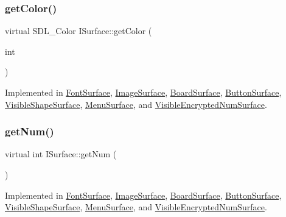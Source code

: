 \mbox{\label{class_i_surface_adf609edb8f871bf37ed9aaf8fe0d2695}} 
\subsubsection{\texorpdfstring{get\+Color()}{getColor()}}
{\footnotesize\ttfamily virtual S\+D\+L\+\_\+\+Color I\+Surface\+::get\+Color (\begin{DoxyParamCaption}\item[{int}]{ }\end{DoxyParamCaption})\hspace{0.3cm}{\ttfamily [pure virtual]}}



Implemented in \mbox{\hyperlink{class_font_surface_afe2bf10c79f421c252fe6a1477ee03dd}{Font\+Surface}}, \mbox{\hyperlink{class_image_surface_a241efe1b9a9cc78e5033f8beff36eb03}{Image\+Surface}}, \mbox{\hyperlink{class_board_surface_aaede8bb86e00ae26f235dd9437ecded7}{Board\+Surface}}, \mbox{\hyperlink{class_button_surface_a4ba118fccc0224e235efcb3b26f0d26c}{Button\+Surface}}, \mbox{\hyperlink{class_visible_shape_surface_a4ffd8c178ae0e39059422ec86bed2034}{Visible\+Shape\+Surface}}, \mbox{\hyperlink{class_menu_surface_a2fa22cd43ecf4f0ca4749f7d95ca771a}{Menu\+Surface}}, and \mbox{\hyperlink{class_visible_encrypted_num_surface_a8c8d92c6bbbcc2e4f8a471449b9b54fa}{Visible\+Encrypted\+Num\+Surface}}.

\mbox{\label{class_i_surface_a1553f92deac310771e6fe63d62fc1d95}} 
\subsubsection{\texorpdfstring{get\+Num()}{getNum()}}
{\footnotesize\ttfamily virtual int I\+Surface\+::get\+Num (\begin{DoxyParamCaption}{ }\end{DoxyParamCaption})\hspace{0.3cm}{\ttfamily [pure virtual]}}



Implemented in \mbox{\hyperlink{class_font_surface_a432d08d23f82d9513332a579c91e1ee6}{Font\+Surface}}, \mbox{\hyperlink{class_image_surface_a6c503dc8cdc23ff1781309c430506e93}{Image\+Surface}}, \mbox{\hyperlink{class_board_surface_ae4a6c65ef771b0a4c46fab6297ce0928}{Board\+Surface}}, \mbox{\hyperlink{class_button_surface_a32a0a3c0d2a706d2aad7ac32d2c96ccd}{Button\+Surface}}, \mbox{\hyperlink{class_visible_shape_surface_af516dd80787f73eb853800b9ac33a8d5}{Visible\+Shape\+Surface}}, \mbox{\hyperlink{class_menu_surface_a6533d04f9c2f57bfffb58d461070e61f}{Menu\+Surface}}, and \mbox{\hyperlink{class_visible_encrypted_num_surface_a2f375428e6bcf6f442a4fa26ffdaccf8}{Visible\+Encrypted\+Num\+Surface}}.

